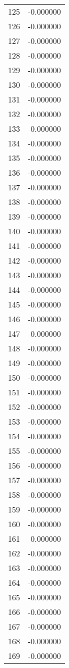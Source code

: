 \documentclass[12pt]{article}
\begin{document}
\begin{longtable}{@{}cc@{}}
125 & -0.000000 \\
126 & -0.000000 \\
127 & -0.000000 \\
128 & -0.000000 \\
129 & -0.000000 \\
130 & -0.000000 \\
131 & -0.000000 \\
132 & -0.000000 \\
133 & -0.000000 \\
134 & -0.000000 \\
135 & -0.000000 \\
136 & -0.000000 \\
137 & -0.000000 \\
138 & -0.000000 \\
139 & -0.000000 \\
140 & -0.000000 \\
141 & -0.000000 \\
142 & -0.000000 \\
143 & -0.000000 \\
144 & -0.000000 \\
145 & -0.000000 \\
146 & -0.000000 \\
147 & -0.000000 \\
148 & -0.000000 \\
149 & -0.000000 \\
150 & -0.000000 \\
151 & -0.000000 \\
152 & -0.000000 \\
153 & -0.000000 \\
154 & -0.000000 \\
155 & -0.000000 \\
156 & -0.000000 \\
157 & -0.000000 \\
158 & -0.000000 \\
159 & -0.000000 \\
160 & -0.000000 \\
161 & -0.000000 \\
162 & -0.000000 \\
163 & -0.000000 \\
164 & -0.000000 \\
165 & -0.000000 \\
166 & -0.000000 \\
167 & -0.000000 \\
168 & -0.000000 \\
169 & -0.000000 \\

\end{longtable}
\end{document}
